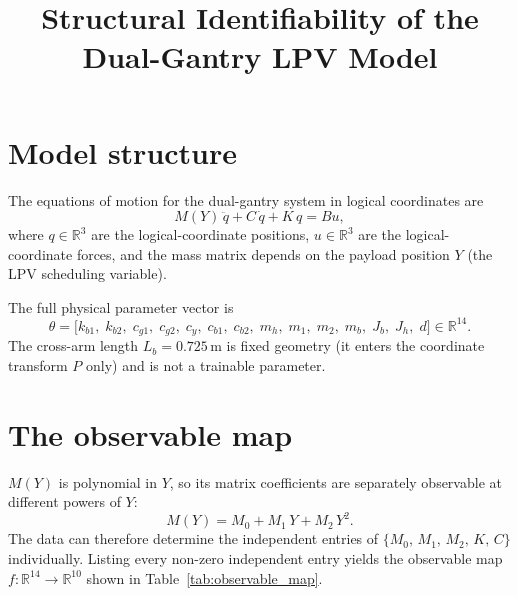 \documentclass[11pt,a4paper]{article}
\title{Structural Identifiability of the Dual-Gantry LPV Model}
\author{}
\date{}
\begin{document}
\maketitle

\section{Model structure}

The equations of motion for the dual-gantry system in logical coordinates are
\begin{equation}
    M(Y)\,\ddot{q} + C\,\dot{q} + K\,q = Bu,
\end{equation}
where $q \in \mathbb{R}^3$ are the logical-coordinate positions,
$u \in \mathbb{R}^3$ are the logical-coordinate forces, and the mass matrix
depends on the payload position $Y$ (the LPV scheduling variable).

The full physical parameter vector is
\begin{equation}
    \theta =
    \bigl[k_{b1},\; k_{b2},\; c_{g1},\; c_{g2},\; c_y,\;
          c_{b1},\; c_{b2},\; m_h,\; m_1,\; m_2,\; m_b,\; J_b,\; J_h,\; d\bigr]
    \in \mathbb{R}^{14}.
\end{equation}
The cross-arm length $L_b = 0.725\,\mathrm{m}$ is fixed geometry (it enters
the coordinate transform $P$ only) and is not a trainable parameter.

\section{The observable map}

$M(Y)$ is polynomial in $Y$, so its matrix coefficients are separately
observable at different powers of $Y$:
\begin{equation}
    M(Y) = M_0 + M_1\,Y + M_2\,Y^2.
\end{equation}
The data can therefore determine the independent entries of
$\{M_0,\,M_1,\,M_2,\,K,\,C\}$ individually.
Listing every non-zero independent entry yields the observable map
$f:\mathbb{R}^{14}\to\mathbb{R}^{10}$ shown in Table~\ref{tab:observable_map}.
\end{document}
